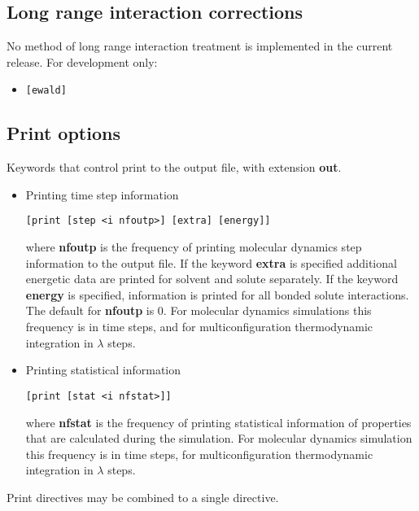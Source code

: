\subsection{Long range interaction corrections}
No method of long range interaction treatment is implemented in the
current release. For development only:
\begin{itemize}
\item
\begin{verbatim}
[ewald]
\end{verbatim}
\end{itemize}
\subsection{Print options}
Keywords that control print to the output file, with extension {\bf out}.
\begin{itemize}
\item
Printing time step information
\begin{verbatim}
[print [step <i nfoutp>] [extra] [energy]]
\end{verbatim}
where {\bf nfoutp} is the frequency of printing molecular dynamics step
information to the output file. If the keyword {\bf extra} is specified
additional energetic data are printed for solvent and solute separately.
If the keyword {\bf energy} is specified, information is printed for
all bonded solute interactions.
The default for {\bf nfoutp} is 0. For molecular dynamics simulations
this frequency is in time steps, and for multiconfiguration thermodynamic
integration in $\lambda$ steps.
\item
Printing statistical information
\begin{verbatim}
[print [stat <i nfstat>]]
\end{verbatim}
where {\bf nfstat} is the frequency of printing statistical information
of properties that are calculated during the simulation. 
For molecular dynamics simulation
this frequency is in time steps, for multiconfiguration thermodynamic
integration in $\lambda$ steps.
\end{itemize}
Print directives may be combined to a single directive.
